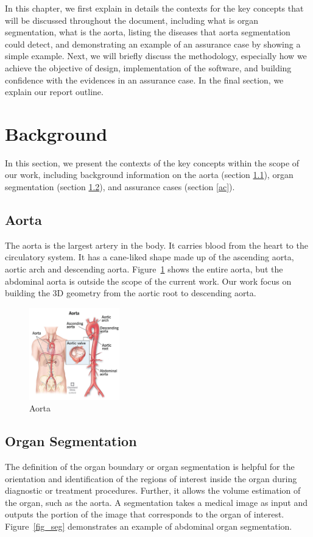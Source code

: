 In this chapter, we first explain in details the contexts for the key concepts that will be discussed throughout the document, including what is organ segmentation, what is the aorta, listing the diseases that aorta segmentation could detect, and demonstrating an example of an assurance case by showing a simple example. Next, we will briefly discuss the methodology, especially how we achieve the objective of design, implementation of the software, and building confidence with the evidences in an assurance case. In the final section, we explain our report outline.

\section{Background} \label{bg}

In this section, we present the contexts of the key concepts within the scope of our work, including background information on the aorta (section \ref{aorta}), organ segmentation (section \ref{organ_seg}), and assurance cases (section \ref{ac}).

\subsection{Aorta}\label{aorta}
The aorta is the largest artery in the body. It carries blood from the heart to the circulatory system. It has a cane-liked shape made up of the ascending aorta, aortic arch and descending aorta. Figure~\ref{fig_aorta} shows the entire aorta, but the abdominal aorta is outside the scope of the current work. Our work focus on building the 3D geometry from the aortic root to descending aorta.

\begin{figure}[ht]
    \centering
    \includegraphics[width=0.35\textwidth]{figures/Intro/Aorta.png}
    \caption[Aorta]{Aorta \cite{Cleveland_Clinic_medical_professional_2021}}
    \label{fig_aorta}
\end{figure}

\subsection{Organ Segmentation}\label{organ_seg}
The definition of the organ boundary or organ segmentation is helpful for the orientation and identification of the regions of interest inside the organ during diagnostic or treatment procedures. Further, it allows the volume estimation of the organ, such as the aorta. A segmentation takes a medical image as input and outputs the portion of the image that corresponds to the organ of interest. Figure~\ref{fig_seg} demonstrates an example of abdominal organ segmentation.

